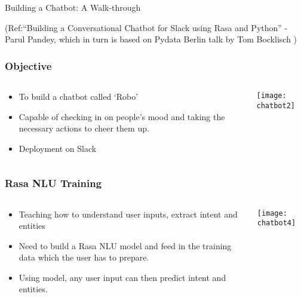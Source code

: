\begin{frame}[fragile]\frametitle{}
\begin{center}
{\Large Building a Chatbot: A Walk-through}

{\tiny (Ref:``Building a Conversational Chatbot for Slack using Rasa and Python'' - Parul Pandey, which in turn is based on Pydata Berlin talk by Tom Bocklisch )}
\end{center}
\end{frame}

 \begin{frame}[fragile]\frametitle{Objective}
   \begin{columns}
    \begin{column}[t]{0.5\linewidth}
\begin{itemize}
\item To build a chatbot called ‘Robo’
\item Capable of checking in on people’s mood and taking the necessary actions to cheer them up.
\item Deployment on Slack 
\end{itemize}
    \end{column}
    \begin{column}[t]{0.5\linewidth}
\begin{center}
\texttt{[image: chatbot2]}
\end{center}
    \end{column}
  \end{columns}
\end{frame}



 \begin{frame}[fragile]\frametitle{Rasa NLU Training}
   \begin{columns}
    \begin{column}[t]{0.5\linewidth}
\begin{itemize}
\item Teaching how to understand user inputs, extract intent and entities
\item Need to build a Rasa NLU model and feed in the training data which the user has to prepare.
\item Using model, any user input can then predict intent and entities.
\end{itemize}
    \end{column}
    \begin{column}[t]{0.5\linewidth}
\begin{center}
\texttt{[image: chatbot4]}
\end{center}
    \end{column}
  \end{columns}
\end{frame}

